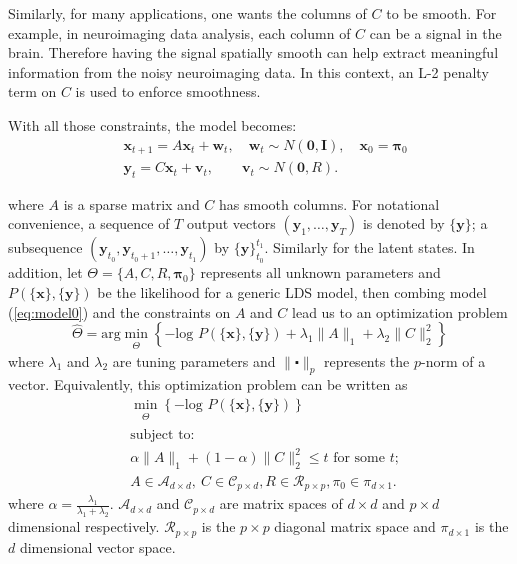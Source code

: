 \documentclass[fleqn]{article}
\let\oldref\ref
\renewcommand{\ref}[1]{(\oldref{#1})}
\begin{document}
Similarly, for many applications, one wants the columns of $C$ to be smooth. For example, in neuroimaging data analysis, each column of $C$ can be a signal in the brain. Therefore having the signal spatially smooth can help extract meaningful information from the noisy neuroimaging data. In this context, an L-2 penalty term on $C$ is used to enforce smoothness.

With all those constraints, the model becomes:
\begin{equation}\label{eq:model0}
\begin{aligned}
	&\mathbf{x}_{t+1}=A\mathbf{x}_{t}+\mathbf{w}_t, \quad \mathbf{w}_t\sim N(\mathbf{0},\mathbf{I}),\quad \mathbf{x}_0 = \mathbf{\pi}_0\\
	&\mathbf{y}_t=C\mathbf{x}_t+\mathbf{v}_t,\qquad \mathbf{v}_t\sim N(\mathbf{0},R).
\end{aligned}
\end{equation}

where $A$ is a sparse matrix and $C$ has smooth columns. For notational convenience, a sequence of $T$ output vectors $(\mathbf{y}_1,\ldots,\mathbf{y}_T)$ is denoted by $\{\mathbf{y}\}$; a subsequence $(\mathbf{y}_{t_0},\mathbf{y}_{t_0 + 1},\ldots,\mathbf{y}_{t_1})$ by $\{\mathbf{y}\}_{t_0}^{t_1}$. Similarly for the latent states. In addition, let $\Theta =\{A,C,R,\mathbf{\pi}_0\}$ represents all unknown parameters and $P(\{\mathbf{x}\},\{\mathbf{y}\})$ be the likelihood for a generic LDS model, then combing model \ref{eq:model0} and the constraints on $A$ and $C$ lead us to an optimization problem
\begin{equation}\label{eqn:penaltylik}
\hat{\Theta}=\text{arg}\min_{\substack{\Theta}}\left\{-\text{log }P(\{\textbf{x}\},\{\textbf{y}\})+\lambda_1\|A\|_1+\lambda_2\|C\|_2^2\right\}
\end{equation}
where $\lambda_1$ and $\lambda_2$ are tuning parameters and $\|\centerdot\|_p$ represents the $p$-norm of a vector. Equivalently, this optimization problem can be written as
\begin{equation}\label{eqn:penaltylikdual}
\begin{aligned}
&\min_{\substack{\Theta}}\left\{-\text{log }P(\{\textbf{x}\},\{\textbf{y}\})\right\}\\
&\text{subject to: }\\
&\alpha\|A\|_1+ (1-\alpha)\|C\|_2^2 \leq t \text{ for some }t;\\
&A\in \mathcal{A}_{d\times d},\ C \in \mathcal{C}_{p \times d}, R \in \mathcal{R}_{p\times p}, \pi_0 \in \mathcal{\pi}_{d\times 1}.
\end{aligned}
\end{equation}
where $\alpha = \frac{\lambda_1}{\lambda_1 + \lambda_2}$. $\mathcal{A}_{d\times d}$ and $\mathcal{C}_{p \times d}$ are matrix spaces of $d\times d$ and $p \times d$ dimensional respectively. $\mathcal{R}_{p \times p}$ is the $p \times p$ diagonal matrix space and $\mathcal{\pi}_{d\times 1}$ is the $d$ dimensional vector space.
\end{document}
